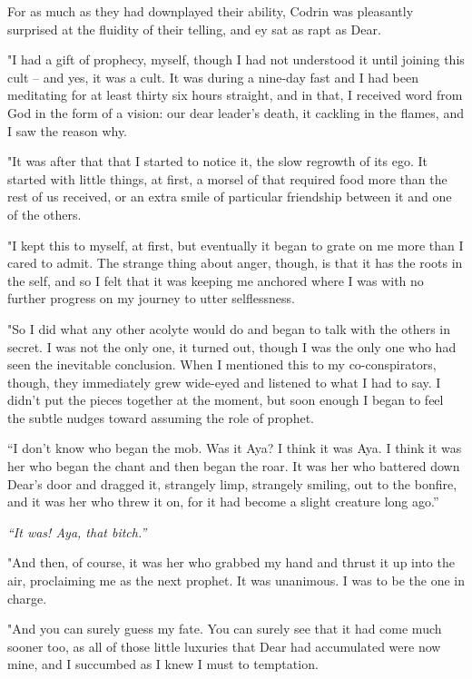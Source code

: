 For as much as they had downplayed their ability, Codrin was pleasantly surprised at the fluidity of their telling, and ey sat as rapt as Dear.

"I had a gift of prophecy, myself, though I had not understood it until joining this cult -- and yes, it was a cult. It was during a nine-day fast and I had been meditating for at least thirty six hours straight, and in that, I received word from God in the form of a vision: our dear leader's death, it cackling in the flames, and I saw the reason why.

"It was after that that I started to notice it, the slow regrowth of its ego. It started with little things, at first, a morsel of that required food more than the rest of us received, or an extra smile of particular friendship between it and one of the others.

"I kept this to myself, at first, but eventually it began to grate on me more than I cared to admit. The strange thing about anger, though, is that it has the roots in the self, and so I felt that it was keeping me anchored where I was with no further progress on my journey to utter selflessness.

"So I did what any other acolyte would do and began to talk with the others in secret. I was not the only one, it turned out, though I was the only one who had seen the inevitable conclusion. When I mentioned this to my co-conspirators, though, they immediately grew wide-eyed and listened to what I had to say. I didn't put the pieces together at the moment, but soon enough I began to feel the subtle nudges toward assuming the role of prophet.

``I don't know who began the mob. Was it Aya? I think it was Aya. I think it was her who began the chant and then began the roar. It was her who battered down Dear's door and dragged it, strangely limp, strangely smiling, out to the bonfire, and it was her who threw it on, for it had become a slight creature long ago.''

\emph{``It was! Aya, that bitch.''}

"And then, of course, it was her who grabbed my hand and thrust it up into the air, proclaiming me as the next prophet. It was unanimous. I was to be the one in charge.

"And you can surely guess my fate. You can surely see that it had come much sooner too, as all of those little luxuries that Dear had accumulated were now mine, and I succumbed as I knew I must to temptation.

